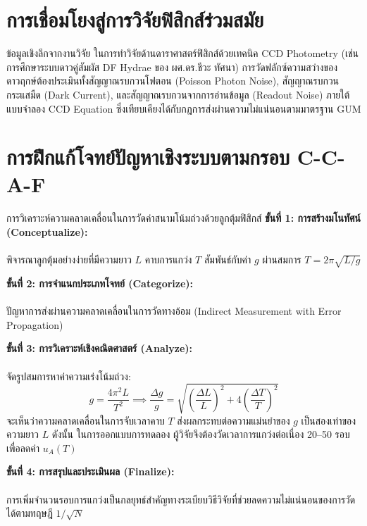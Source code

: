 \section{การเชื่อมโยงสู่การวิจัยฟิสิกส์ร่วมสมัย}

\begin{researchbox}{ข้อมูลเชิงลึกจากงานวิจัย}
ในการทำวิจัยด้านดาราศาสตร์ฟิสิกส์ด้วยเทคนิค CCD Photometry (เช่น การศึกษาระบบดาวคู่สัมผัส DF Hydrae ของ ผศ.ดร.ชีวะ ทัศนา) การวัดฟลักซ์ความสว่างของดาวฤกษ์ต้องประเมินทั้งสัญญาณรบกวนโฟตอน (Poisson Photon Noise), สัญญาณรบกวนกระแสมืด (Dark Current), และสัญญาณรบกวนจากการอ่านข้อมูล (Readout Noise) ภายใต้แบบจำลอง CCD Equation ซึ่งเทียบเคียงได้กับกฎการส่งผ่านความไม่แน่นอนตามมาตรฐาน GUM
\end{researchbox}

\section{การฝึกแก้โจทย์ปัญหาเชิงระบบตามกรอบ C-C-A-F}

\begin{ccafsolution}{การวิเคราะห์ความคลาดเคลื่อนในการวัดค่าสนามโน้มถ่วงด้วยลูกตุ้มฟิสิกส์}
\textbf{ขั้นที่ 1: การสร้างมโนทัศน์ (Conceptualize):}\\\\ พิจารณาลูกตุ้มอย่างง่ายที่มีความยาว $L$ คาบการแกว่ง $T$ สัมพันธ์กับค่า $g$ ผ่านสมการ $T = 2\pi\sqrt{L/g}$

\vspace{4pt}
\textbf{ขั้นที่ 2: การจำแนกประเภทโจทย์ (Categorize):}\\\\ ปัญหาการส่งผ่านความคลาดเคลื่อนในการวัดทางอ้อม (Indirect Measurement with Error Propagation)

\vspace{4pt}
\textbf{ขั้นที่ 3: การวิเคราะห์เชิงคณิตศาสตร์ (Analyze):}\\\\ จัดรูปสมการหาค่าความเร่งโน้มถ่วง:
\begin{equation}
g = \frac{4\pi^2 L}{T^2} \implies \frac{\Delta g}{g} = \sqrt{\left(\frac{\Delta L}{L}\right)^2 + 4\left(\frac{\Delta T}{T}\right)^2}
\end{equation}
จะเห็นว่าความคลาดเคลื่อนในการจับเวลาคาบ $T$ ส่งผลกระทบต่อความแม่นยำของ $g$ เป็นสองเท่าของความยาว $L$ ดังนั้น ในการออกแบบการทดลอง ผู้วิจัยจึงต้องวัดเวลาการแกว่งต่อเนื่อง 20--50 รอบ เพื่อลดค่า $u_A(T)$

\vspace{4pt}
\textbf{ขั้นที่ 4: การสรุปและประเมินผล (Finalize):}\\\\ การเพิ่มจำนวนรอบการแกว่งเป็นกลยุทธ์สำคัญทางระเบียบวิธีวิจัยที่ช่วยลดความไม่แน่นอนของการวัดได้ตามทฤษฎี $1/\sqrt{N}$
\end{ccafsolution}

